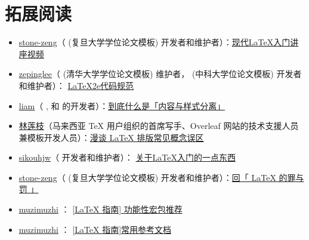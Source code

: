 
\section{拓展阅读} \label{sec:拓展阅读}

\begin{itemize}
  \item \href{https://github.com/stone-zeng}{stone-zeng}（  (复旦大学学位论文模板) 开发者和维护者）：\href{https://www.bilibili.com/video/BV1RE411W7FS?p=1}{现代LaTeX入门讲座视频} 
  \item \href{https://github.com/zepinglee}{zepinglee}（  (清华大学学位论文模板) 维护者， (中科大学位论文模板) 开发者和维护者）： \href{https://gitee.com/zepinglee/latex2e-style-guide}{LaTeX2e代码规范} 
  \item \href{https://liam.page/}{liam}（  ,  和  的开发者）：\href{https://liam.page/2019/03/18/separation-of-content-and-presentation/}{到底什么是「内容与样式分离」}
  \item \href{http://liantze.penguinattack.org/index.html}{林莲枝}（马来西亚 TeX 用户组织的首席写手、Overleaf 网站的技术支援人员兼模板开发人员）：\href{https://www.bilibili.com/video/BV1r4411o7KJ?spm_id_from=333.999.0.0}{漫谈 LaTeX 排版常见概念误区}
  \item \href{https://github.com/sikouhjw}{sikouhjw}（  开发者和维护者）： \href{https://sikouhjw.github.io/2020/03/08/2020-03-08-Learn-LaTeX}{关于LaTeX入门的一点东西} 
  \item \href{https://github.com/stone-zeng}{stone-zeng}（  (复旦大学学位论文模板) 开发者和维护者）：\href{https://stone-zeng.github.io/2019-07-23-latex-crime-and-punishment/}{回「 LaTeX 的罪与罚 」}
  \item \href{https://zhuanlan.zhihu.com/typography-and-latex/}{muzimuzhi} ： \href{https://zhuanlan.zhihu.com/p/43981639}{[LaTeX 指南] 功能性宏包推荐}
  \item \href{https://zhuanlan.zhihu.com/typography-and-latex/}{muzimuzhi} ： \href{https://zhuanlan.zhihu.com/p/43938945}{[LaTeX 指南]常用参考文档}
\end{itemize}